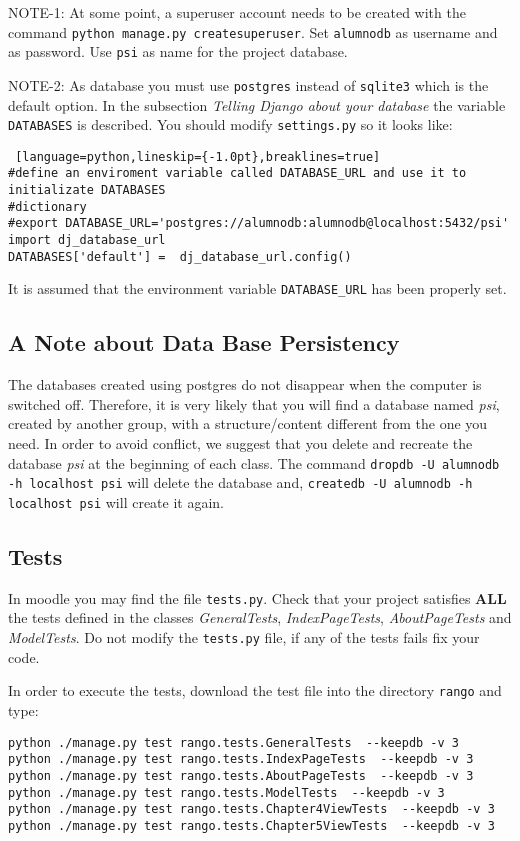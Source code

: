 \documentclass[12pt]{article} %
\begin{document}
NOTE-1: At some point, a superuser account needs to be created with the command \texttt{python manage.py createsuperuser}. Set \texttt{alumnodb} as username and as password. Use \texttt{psi} as name for the project database. 

NOTE-2: As database you must use \texttt{postgres} instead of \texttt{sqlite3} which is the default option. In the subsection \textit{Telling Django about your database} the variable  \texttt{DATABASES} is described. You should modify \texttt{settings.py} so it looks like:\\
\begin{lstlisting} [language=python,lineskip={-1.0pt},breaklines=true] 
#define an enviroment variable called DATABASE_URL and use it to initializate DATABASES
#dictionary
#export DATABASE_URL='postgres://alumnodb:alumnodb@localhost:5432/psi'
import dj_database_url
DATABASES['default'] =  dj_database_url.config()   
\end{lstlisting}
It is assumed that the environment variable  \texttt{DATABASE\_URL} has been properly set.

\subsection{A Note about Data Base Persistency}
The databases created using postgres do not disappear when the computer is switched off. Therefore, it is very likely that you will find a database named \textit{psi}, created by another group, with a structure/content different from the one you need. In order to avoid conflict, we suggest that you delete and recreate the database \textit{psi} at the beginning of each class. The command  \texttt{dropdb -U alumnodb -h localhost psi} will delete the database and,  \texttt{createdb -U alumnodb -h localhost psi}  will create it again.

\subsection{Tests}
In moodle you may find the file \texttt{tests.py}. Check that your project satisfies \textbf{ALL} the tests defined in the classes \textit{GeneralTests}, \textit{IndexPageTests}, \textit{AboutPageTests} and \textit{ModelTests}. Do not modify the \texttt{tests.py} file, if any of the tests fails fix your code.

In order to execute the tests, download the test file into the directory \texttt{rango} and type:
\begin{verbatim}
python ./manage.py test rango.tests.GeneralTests  --keepdb -v 3
python ./manage.py test rango.tests.IndexPageTests  --keepdb -v 3
python ./manage.py test rango.tests.AboutPageTests  --keepdb -v 3
python ./manage.py test rango.tests.ModelTests  --keepdb -v 3
python ./manage.py test rango.tests.Chapter4ViewTests  --keepdb -v 3
python ./manage.py test rango.tests.Chapter5ViewTests  --keepdb -v 3
\end{verbatim}
\end{document}
